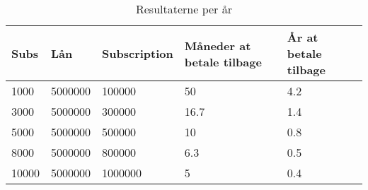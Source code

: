\cfoot{\page\textbackslash \totalp} %
\begin{table}
\begin{center}
\begin{tabularx}{0.75\textwidth}{|X|X|X|X|X|}
\hline
Subs & Lån & Subscription & Måneder at betale tilbage & År at betale tilbage\\ \hline \hline
1000 & 5000000 & 100000 & 50 & 4.2 \\ \hline
3000 & 5000000 & 300000 & 16.7 & 1.4 \\ \hline
5000 & 5000000 & 500000 & 10 & 0.8 \\ \hline
8000 & 5000000 & 800000 & 6.3 & 0.5 \\ \hline
10000 & 5000000 & 1000000 & 5 & 0.4 \\ \hline
\end{tabularx}
\end{center}
\caption{Resultaterne per år}
\end{table}